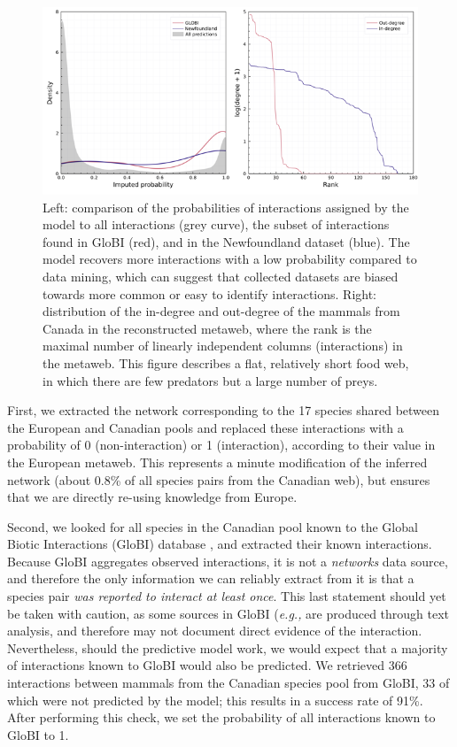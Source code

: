 \begin{figure}[h]
    \centering
    \includegraphics[width=\textwidth]{figures/figure-validation.png}
    \caption{Left: comparison of the probabilities of interactions assigned
by the model to all interactions (grey curve), the subset of
interactions found in GloBI (red), and in the \cite{Strong2014ImpNon}
Newfoundland dataset (blue). The model recovers more interactions with a
low probability compared to data mining, which can suggest that
collected datasets are biased towards more common or easy to identify
interactions. Right: distribution of the in-degree and out-degree of the
mammals from Canada in the reconstructed metaweb, where the rank is the
maximal number of linearly independent columns (interactions) in the
metaweb. This figure describes a flat, relatively short food web, in
which there are few predators but a large number of
preys.}
    \label{fig:inflation}
\end{figure}

First, we extracted the network corresponding to the 17 species shared
between the European and Canadian pools and replaced these interactions
with a probability of 0 (non-interaction) or 1 (interaction), according
to their value in the European metaweb. This represents a minute
modification of the inferred network (about 0.8\% of all species pairs
from the Canadian web), but ensures that we are directly re-using
knowledge from Europe.

Second, we looked for all species in the Canadian pool known to the
Global Biotic Interactions (GloBI) database \cite{Poelen2014GloBio}, and
extracted their known interactions. Because GloBI aggregates observed
interactions, it is not a \emph{networks} data source, and therefore the
only information we can reliably extract from it is that a species pair
\emph{was reported to interact at least once}. This last statement
should yet be taken with caution, as some sources in GloBI (\emph{e.g.,}
\cite{Thessen2014KnoExt} are produced through text analysis, and therefore
may not document direct evidence of the interaction. Nevertheless,
should the predictive model work, we would expect that a majority of
interactions known to GloBI would also be predicted. We retrieved 366
interactions between mammals from the Canadian species pool from GloBI,
33 of which were not predicted by the model; this results in a success
rate of 91\%. After performing this check, we set the probability of all
interactions known to GloBI to 1.

